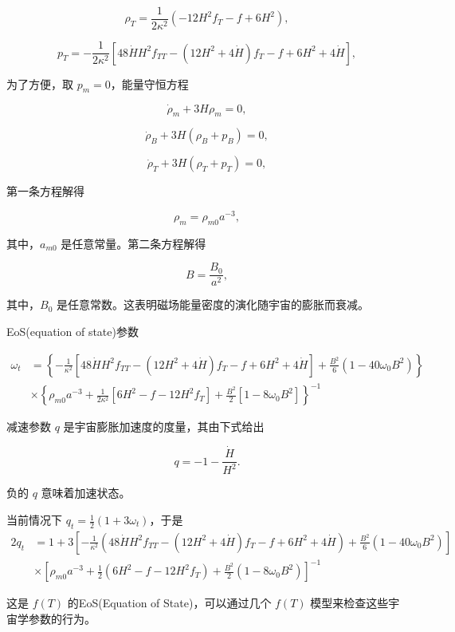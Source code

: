 \documentclass[aps,prl,preprint,groupedaddress,showkeys]{revtex4-2}
\begin{document}
$$
\rho_T = \frac{1 }{2\kappa^2 } \left(-12 H^2 f_T - f + 6H^2 \right),
$$

$$
p_T = -\frac{1 }{2\kappa^2 } \left[48\dot{H}H^2 f_{TT} - \left(12 H^2 + 4\dot{H} \right) f_T - f + 6 H^2 + 4\dot{H} \right],
$$

为了方便，取 $p_m=0$，能量守恒方程

$$
\dot{\rho}_m + 3H \rho_m = 0,
$$

$$
\dot{\rho}_B + 3H\left(\rho_B + p_B \right) = 0,
$$

$$
\dot{\rho}_T + 3H\left(\rho_T + p_T \right) = 0,
$$

第一条方程解得

$$
\rho_m = \rho_{m0} a^{-3},
$$

其中，$a_{m0}$ 是任意常量。第二条方程解得

$$
B=\frac{B_0}{a^2},
$$

其中，$B_0$ 是任意常数。这表明磁场能量密度的演化随宇宙的膨胀而衰减。

EoS(equation of state)参数

$$
\begin{aligned}
    \omega_t
    &=\left\{-\frac{1 }{\kappa^2 } \left[48\dot{H}H^2 f_{TT} - \left(12 H^2 + 4\dot{H} \right) f_T - f + 6 H^2 + 4\dot{H} \right] + \frac{B^2 }{6 } \left(1-40\omega_0 B^2 \right) \right\} \\
    &\times \left\{\rho_{m0} a^{-3} + \frac{1 }{2\kappa^2 } \left[6 H^2 - f-12 H^2 f_T \right] + \frac{B^2 }{2 } \left[1-8\omega_0 B^2 \right] \right\}^{-1}
    \end{aligned}
$$

减速参数 $q$ 是宇宙膨胀加速度的度量，其由下式给出

$$
q = -1 - \frac{\dot{H} }{H^2 } .
$$

负的 $q$ 意味着加速状态。

当前情况下 $q_t=\frac{1}{2}(1+3\omega_t)$，于是
$$
\begin{aligned}
    2q_t
    &=1 + 3\left[-\frac{1 }{\kappa^2 } \left(48\dot{H} H^2 f_{TT} - \left(12 H^2 + 4\dot{H} \right) f_T - f + 6H^2 + 4\dot{H} \right) + \frac{B^2 }{6 } \left(1-40\omega_0 B^2 \right) \right] \\
    &\times \left[\rho_{m0}a^{-3} + \frac{1 }{2 } \left(6H^2-f-12H^2 f_T \right) + \frac{B^2 }{2 } \left(1-8\omega_0 B^2 \right) \right]^{-1}
\end{aligned}
$$

这是 $f(T)$ 的EoS(Equation of State)，可以通过几个 $f(T)$ 模型来检查这些宇宙学参数的行为。
\end{document}

